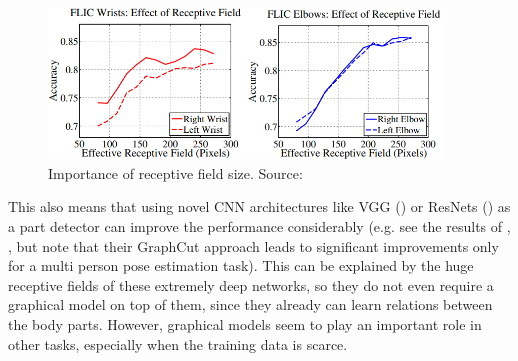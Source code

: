 \documentclass[a4paper,10pt]{article}
\begin{document}
    \begin{figure}[H]
    	\includegraphics[height=4cm]{img/receptive_field_importance.png}
    	\caption{Importance of receptive field size. Source: \cite{conv_pose_machines}}
    	\label{rec_field}
    \end{figure}
    This also means that using novel CNN architectures like VGG (\cite{vgg}) or ResNets (\cite{resnets}) as a part detector can improve the performance considerably (e.g. see the results of \cite{deepcut}, \cite{deepercut}, but note that their GraphCut approach leads to significant improvements only for a multi person pose estimation task). This can be explained by the huge receptive fields of these extremely deep networks, so they do not even require a graphical model on top of them, since they already can learn relations between the body parts. However, graphical models seem to play an important role in other tasks, especially when the training data is scarce.
    
    
 
 
	\newpage
	\renewcommand{\thepage}{}
	
	
	\newpage
	
	
\end{document}
